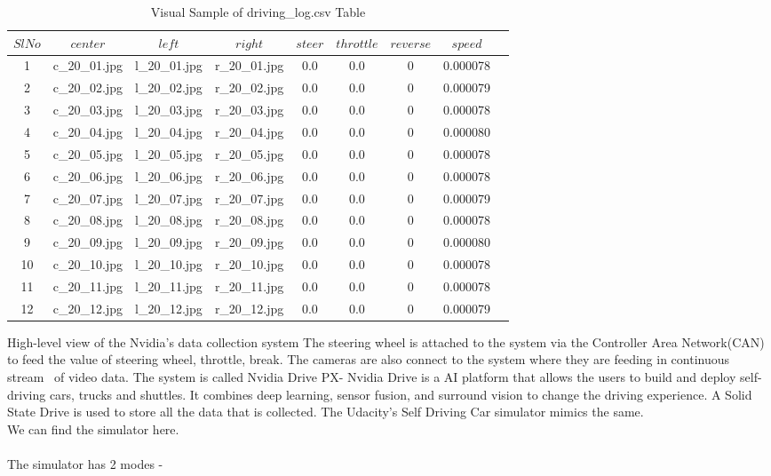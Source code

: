 \begin{table}[H]
	\centering
	\begin{tabular}{|c|c|c|c|c|c|c|c|c|}
		\hline
		$Sl No$ & $center$ & $left$ & $right$ & $steer$ & $throttle$ & $reverse$ & $speed$\\
		\hline
		1 & c\_20\_01.jpg & l\_20\_01.jpg & r\_20\_01.jpg & 0.0 & 0.0 & 0 & 0.000078 \\
		\hline
		2 & c\_20\_02.jpg & l\_20\_02.jpg & r\_20\_02.jpg & 0.0 & 0.0 & 0 & 0.000079 \\
		\hline
		3 & c\_20\_03.jpg & l\_20\_03.jpg & r\_20\_03.jpg & 0.0 & 0.0 & 0 & 0.000078 \\
		\hline
		4 & c\_20\_04.jpg & l\_20\_04.jpg & r\_20\_04.jpg & 0.0 & 0.0 & 0 & 0.000080 \\
		\hline
		5 & c\_20\_05.jpg & l\_20\_05.jpg & r\_20\_05.jpg & 0.0 & 0.0 & 0 & 0.000078 \\
		\hline
		6 & c\_20\_06.jpg & l\_20\_06.jpg & r\_20\_06.jpg & 0.0 & 0.0 & 0 & 0.000078 \\
		\hline
		7 & c\_20\_07.jpg & l\_20\_07.jpg & r\_20\_07.jpg & 0.0 & 0.0 & 0 & 0.000079 \\
		\hline
		8 & c\_20\_08.jpg & l\_20\_08.jpg & r\_20\_08.jpg & 0.0 & 0.0 & 0 & 0.000078 \\
		\hline
		9 & c\_20\_09.jpg & l\_20\_09.jpg & r\_20\_09.jpg & 0.0 & 0.0 & 0 & 0.000080 \\
		\hline
		10 & c\_20\_10.jpg & l\_20\_10.jpg & r\_20\_10.jpg & 0.0 & 0.0 & 0 & 0.000078 \\
		\hline
		11 & c\_20\_11.jpg & l\_20\_11.jpg & r\_20\_11.jpg & 0.0 & 0.0 & 0 & 0.000078 \\
		\hline
		12 & c\_20\_12.jpg & l\_20\_12.jpg & r\_20\_12.jpg & 0.0 & 0.0 & 0 & 0.000079 \\
		\hline
	\end{tabular}
	\caption{Visual Sample of driving\_log.csv Table}
\end{table}

High-level view of the Nvidia’s data collection system
The steering wheel is attached to the system via the Controller Area Network(CAN) to feed the value of steering wheel, throttle, break. The cameras are also connect to the system where they are feeding in continuous stream~\cite{angelov2018practical} of video data. The system is called Nvidia Drive PX- Nvidia Drive is a AI platform that allows the users to build and deploy self-driving cars, trucks and shuttles. It combines deep learning, sensor fusion, and surround vision to change the driving experience. A Solid State Drive is used to store all the data that is collected. The Udacity’s Self Driving Car simulator mimics the same.\\
We can find the simulator here.\\\\
The simulator has 2 modes -

